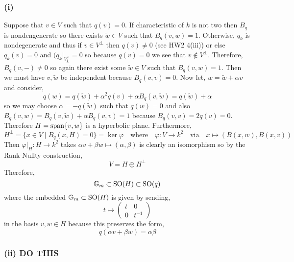 \documentclass[12pt]{article}
\begin{document}
\subsubsection{(i)}

Suppose that $v \in V$ such that $q(v) = 0$. If characteristic of $k$ is not two then $B_q$ is nondengenerate so there exists $\tilde{w} \in V$ such that $B_q(v, w) = 1$. Otherwise, $q_{\bar{k}}$ is nondegenerate and thus if $v \in V^\perp$ then $q(v) \neq 0$ (see HW2 4(iii)) or else $q_{\bar{k}}(v) = 0$ and $(q_{\bar{k}}|_{V_{\bar{k}}^\perp} = 0$ so because $q(v) = 0$ we see that $v \notin V^\perp$. Therefore, $B_q(v, -) \neq 0$ so again there exist some $\tilde{w} \in V$ such that $B_q(v, w) = 1$. Then we must have $v, \tilde{w}$ be independent because $B_q(v, v) = 0$. Now let, $w = \tilde{w} + \alpha v$
and consider,
\[ q(w) = q(\tilde{w}) + \alpha^2 q(v) + \alpha B_q(v, \tilde{w}) = q(\tilde{w}) + \alpha \]
so we may choose $\alpha = - q(\tilde{w})$ such that $q(w) = 0$ and also $B_q(v, w) = B_q(v, \tilde{w}) + \alpha B_q(v, v) = 1$ because $B_q(v, v) = 2 q(v) = 0$. Therefore $H = \mathrm{span}\! \left\{v,w \right\}$ is a hyperbolic plane. Furthermore, 
\[ H^\perp = \{ x \in V \mid B_q(x, H) = 0 \} = \ker{\varphi} \quad \text{where} \quad \varphi : V \to k^2 \quad \text{via} \quad x \mapsto (B(x,w), B(x,v)) \] 
Then $\varphi|_H : H \to k^2$ takes $\alpha v + \beta w \mapsto (\alpha, \beta)$ is clearly an isomorphism so by the Rank-Nullty construction,
\[ V = H \oplus H^\perp \]
Therefore, 
\[ {\mathbb{G}_m} \subset \mathrm{SO}(H) \subset \mathrm{SO}(q) \]
where the embedded ${\mathbb{G}_m} \subset \mathrm{SO}(H)$ is given by sending,
\[ t \mapsto \begin{pmatrix}
t & 0
\\
0 & t^{-1}
\end{pmatrix}
\]
in the basis $v, w \in H$ because this preserves the form,
\[ q(\alpha v + \beta w) = \alpha \beta \]

\subsubsection{(ii) DO THIS}
\end{document}
